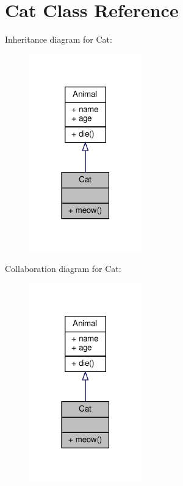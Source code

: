\hypertarget{classCat}{}\section{Cat Class Reference}
\label{classCat}


Inheritance diagram for Cat\+:
\nopagebreak
\begin{figure}[H]
\begin{center}
\leavevmode
\includegraphics[width=138pt]{classCat__inherit__graph}
\end{center}
\end{figure}


Collaboration diagram for Cat\+:
\nopagebreak
\begin{figure}[H]
\begin{center}
\leavevmode
\includegraphics[width=138pt]{classCat__coll__graph}
\end{center}
\end{figure}
